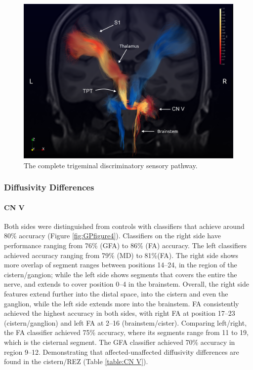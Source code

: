 \begin{figure}[ht]
\centering
\includegraphics[width=\linewidth]{view-left-right.png}
\caption{The complete trigeminal discriminatory sensory pathway. }
\label{fig:GPfigure3}
\end{figure}

\subsubsection{Diffusivity Differences}
\paragraph{CN V}
Both sides were distinguished from controls with classifiers that achieve around 80\% accuracy (Figure \ref{fig:GPfigure4}). 
Classifiers on the right side have performance ranging from 76\% (GFA) to 86\% (FA) accuracy. The left classifiers achieved accuracy ranging from 79\% (MD) to 81\%(FA). The right side shows more overlap of segment ranges between positions 14--24, in the region of the cistern/gangion; while the left side shows segments that covers the entire the nerve, and extends to cover position 0--4 in the brainstem. Overall, the right side features extend further into the distal space, into the cistern and even the ganglion, while the left side extends more into the brainstem. FA consistently achieved the highest accuracy in both sides, with right FA at position 17--23 (cistern/ganglion) and left FA at 2--16 (brainstem/cister).
Comparing left/right, the FA classifier achieved 75\% accuracy, where its segments range from 11 to 19, which is the cisternal segment. The GFA classifier achieved 70\% accuracy in region 9--12. Demonstrating that affected-unaffected diffusivity differences are found in the cistern/REZ (Table \ref{table:CN V}).

